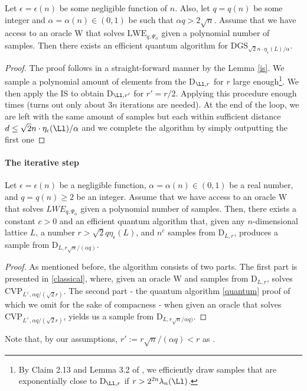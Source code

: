 \begin{theorem}\label{heart}
	Let $\epsilon = \epsilon(n)$ be some negligible function of $n$. Also, let $q = q(n)$ be some integer and $\alpha = \alpha(n) \in (0, 1)$ be such that $\alpha q > 2\sqrt{n}$. Assume that we have access to an oracle W that solves $\text{LWE}_{q,\Psi_{\alpha}}$ given a polynomial number of samples. Then there exists an efficient quantum algorithm for $\text{DGS}_{\sqrt{2}n \cdot \eta_{\epsilon}(L)/\alpha}$.
\end{theorem}
\begin{proof}
	The proof follows in a straight-forward manner by the Lemma \ref{is}. We sample a polynomial amount of elements from the D$_{\Ll, r}$ for $r$ large enough\footnote{By Claim 2.13 and Lemma 3.2 of \cite{regev}, we efficiently draw samples that are exponentially close to D$_{\Ll, r}$ if $r > 2^{2n} \lambda_n(\Ll)$.}. We then apply the IS to obtain D$_{\Ll, r'}$ for $r' = r/2$. Applying this procedure enough times (turns out only about $3n$ iterations are needed). At the end of the loop, we are left with the same amount of samples but each within sufficient distance $d \leq \sqrt{2}n \cdot \eta_{\epsilon}(\Ll)/\alpha$ and we complete the algorithm by simply outputting the first one
\end{proof}

\paragraph{The iterative step}
\begin{lemma}\label{is}
	Let $\epsilon = \epsilon(n)$ be a negligible function, $\alpha = \alpha(n) \in (0, 1)$ be a real number, and $q = q(n) \geq 2$ be an integer. Assume that we have access to an oracle W that solves $LWE_{q,\Psi_{\alpha}}$ given a polynomial number of samples. Then, there exists a constant $c > 0$ and an efficient quantum algorithm that, given any $n$-dimensional lattice $L$, a number $r > \sqrt{2}q \eta_{\epsilon}(L)$, and $n^c$ samples from $\text{D}_{L,r}$, produces a sample from $\text{D}_{L,r\sqrt{n}/(\alpha q)}$.
\end{lemma}
\begin{proof}
	As mentioned before, the algorithm consists of two parts. The first part is presented in \ref{classical}, where, given an oracle W and samples from $\text{D}_{L,r}$, solves $\text{CVP}_{L^{\vee}, \alpha q / (\sqrt{2} r)}$. The second part - the quantum algorithm \ref{quantum} proof of which we omit for the sake of compacness - when given an oracle that solves $\text{CVP}_{L^{\vee}, \alpha q / (\sqrt{2} r)}$, yields us a sample from $\text{D}_{L, r\sqrt{n}/\alpha q)}$.
\end{proof}
Note that, by our assumptions, $r' := r\sqrt{n}/(\alpha q) < r$ as .

